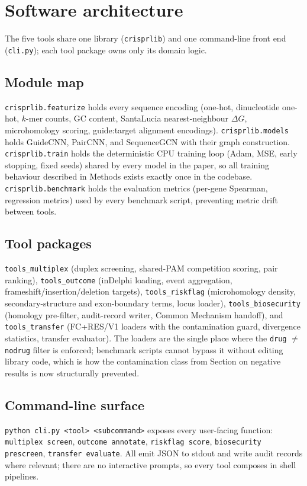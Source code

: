 \section{Software architecture}
The five tools share one library (\texttt{crisprlib}) and one command-line
front end (\texttt{cli.py}); each tool package owns only its domain logic.

\subsection{Module map}
\texttt{crisprlib.featurize} holds every sequence encoding (one-hot,
dinucleotide one-hot, $k$-mer counts, GC content, SantaLucia nearest-neighbour
$\Delta G$, microhomology scoring, guide:target alignment encodings).
\texttt{crisprlib.models} holds GuideCNN, PairCNN, and SequenceGCN with their
graph construction. \texttt{crisprlib.train} holds the deterministic CPU
training loop (Adam, MSE, early stopping, fixed seeds) shared by every model
in the paper, so all training behaviour described in Methods exists exactly
once in the codebase. \texttt{crisprlib.benchmark} holds the evaluation
metrics (per-gene Spearman, regression metrics) used by every benchmark
script, preventing metric drift between tools.

\subsection{Tool packages}
\texttt{tools\_multiplex} (duplex screening, shared-PAM competition scoring,
pair ranking), \texttt{tools\_outcome} (inDelphi loading, event aggregation,
frameshift/insertion/deletion targets), \texttt{tools\_riskflag}
(microhomology density, secondary-structure and exon-boundary terms, locus
loader), \texttt{tools\_biosecurity} (homology pre-filter, audit-record
writer, Common Mechanism handoff), and \texttt{tools\_transfer} (FC+RES/V1
loaders with the contamination guard, divergence statistics, transfer
evaluator). The loaders are the single place where the
\texttt{drug} $\neq$ \texttt{nodrug} filter is enforced; benchmark scripts
cannot bypass it without editing library code, which is how the contamination
class from Section on negative results is now structurally prevented.

\subsection{Command-line surface}
\texttt{python cli.py <tool> <subcommand>} exposes every user-facing
function: \texttt{multiplex screen}, \texttt{outcome annotate},
\texttt{riskflag score}, \texttt{biosecurity prescreen}, \texttt{transfer
evaluate}. All emit JSON to stdout and write audit records where relevant;
there are no interactive prompts, so every tool composes in shell pipelines.


